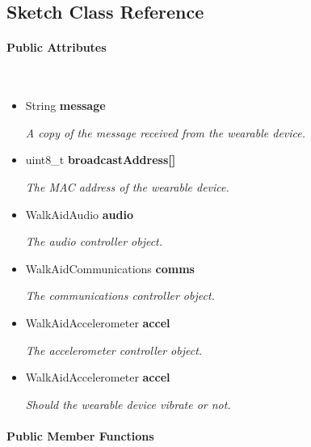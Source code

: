 \subsection{Sketch Class Reference}
\label{subsec:sketch_walking_aid}\mbox{}

    \paragraph{Public Attributes}\mbox{}\\

        \begin{itemize}
            \item String \textbf{message}
            
                \quad \quad \textit{A copy of the message received from the wearable device.}

            \item uint8\_t \textbf{broadcastAddress[]}
            
                \quad \quad \textit{The MAC address of the wearable device.}

            \item WalkAidAudio \textbf{audio}
            
                \quad \quad \textit{The audio controller object.}

            \item WalkAidCommunications \textbf{comms}
            
                \quad \quad \textit{The communications controller object.}
                
            \item WalkAidAccelerometer \textbf{accel}
            
                \quad \quad \textit{The accelerometer controller object.}
                
            \item WalkAidAccelerometer \textbf{accel}
            
                \quad \quad \textit{Should the wearable device vibrate or not.}\\

        \end{itemize}


    \paragraph{Public Member Functions}\mbox{}\\

